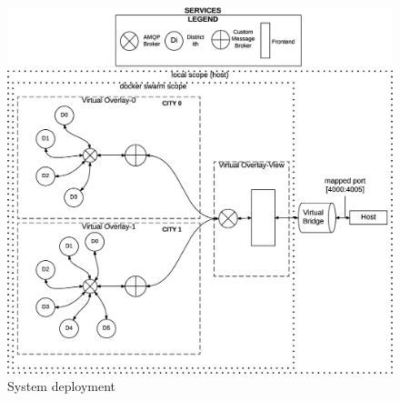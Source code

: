 \begin{figure}[H]
  \centering
  \includegraphics[scale=0.25,keepaspectratio]
    {images/overall/deploy.eps}
  \caption{System deployment}
  \label{fig:ovrl-deployment}
\end{figure}
